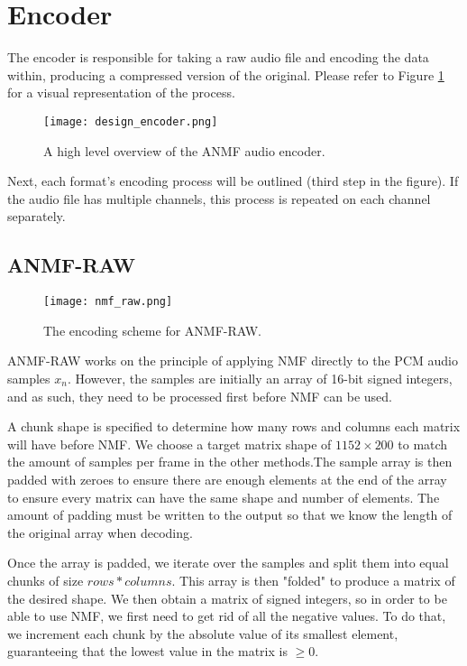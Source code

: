 \section{Encoder}
The encoder is responsible for taking a raw audio file and encoding the data within, producing a compressed version of the original. Please refer to Figure \ref{fig:design_encoder} for a visual representation of the process.

\begin{figure}[ht]
	\caption[Encoder overview]{A high level overview of the ANMF audio encoder.}
	\label{fig:design_encoder}
	\centering
	\texttt{[image: design\_encoder.png]}
\end{figure}

Next, each format's encoding process will be outlined (third step in the figure). If the audio file has multiple channels, this process is repeated on each channel separately.

\subsection{ANMF-RAW}
\begin{figure}[ht]
	\caption[ANMF-RAW Encoder]{The encoding scheme for ANMF-RAW.}
	\label{fig:encoding_nmf_raw}
	\centering
	\texttt{[image: nmf\_raw.png]}
\end{figure}

ANMF-RAW works on the principle of applying NMF directly to the PCM audio samples $x_n$. However, the samples are initially an array of 16-bit signed integers, and as such, they need to be processed first before NMF can be used.

A chunk shape is specified to determine how many rows and columns each matrix will have before NMF. We choose a target matrix shape of $1152 \times 200$ to match the amount of samples per frame in the other methods.The sample array is then padded with zeroes to ensure there are enough elements at the end of the array to ensure every matrix can have the same shape and number of elements. The amount of padding must be written to the output so that we know the length of the original array when decoding.

Once the array is padded, we iterate over the samples and split them into equal chunks of size $rows*columns$. This array is then "folded" to produce a matrix of the desired shape. We then obtain a matrix of signed integers, so in order to be able to use NMF, we first need to get rid of all the negative values. To do that, we increment each chunk by the absolute value of its smallest element, guaranteeing that the lowest value in the matrix is $\ge 0$.

